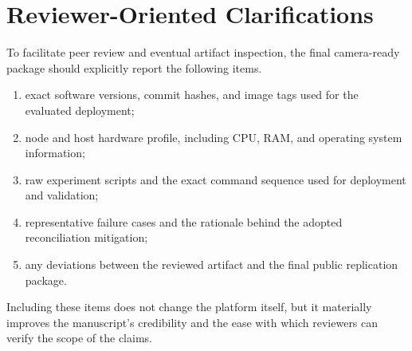 \section{Reviewer-Oriented Clarifications}
To facilitate peer review and eventual artifact inspection, the final camera-ready package should explicitly report the following items.
\begin{enumerate}[label=\arabic*)]
    \item exact software versions, commit hashes, and image tags used for the evaluated deployment;
    \item node and host hardware profile, including CPU, RAM, and operating system information;
    \item raw experiment scripts and the exact command sequence used for deployment and validation;
    \item representative failure cases and the rationale behind the adopted reconciliation mitigation;
    \item any deviations between the reviewed artifact and the final public replication package.
\end{enumerate}

Including these items does not change the platform itself, but it materially improves the manuscript's credibility and the ease with which reviewers can verify the scope of the claims.
